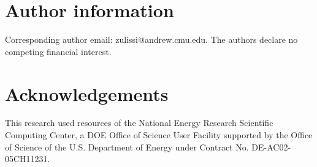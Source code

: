 \documentclass[]{achemso}
\begin{document}
\section*{Author information} Corresponding author email:  zulissi@andrew.cmu.edu.
The authors declare no competing financial interest.

\section*{Acknowledgements} This research used resources of the National Energy Research Scientific Computing Center, a DOE Office of Science User Facility supported by the Office of Science of the U.S. Department of Energy under Contract No. DE-AC02-05CH11231. %



\clearpage

\end{document}
